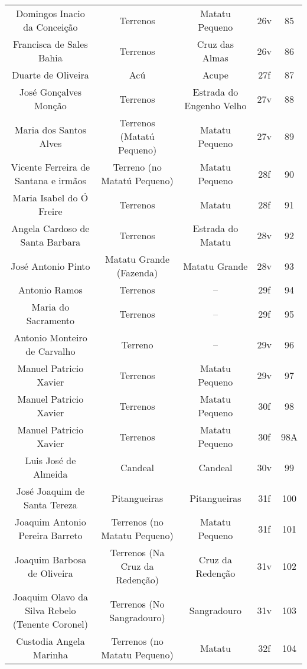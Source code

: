 \begin{table}[!htp]
{\begin{tiny}
\begin{tabular}{ccccc}
Domingos Inacio da Conceição							&Terrenos				&Matatu Pequeno				&26v			&85			&\\
Francisca de Sales Bahia							&Terrenos				&Cruz das Almas				&26v			&86			&\\
Duarte de Oliveira								&Acú					&Acupe					&27f			&87			&\\
José Gonçalves Monção								&Terrenos				&Estrada do Engenho Velho		&27v			&88			&\\
Maria dos Santos Alves								&Terrenos (Matatú Pequeno)		&Matatu Pequeno				&27v			&89			&\\
Vicente Ferreira de Santana e irmãos						&Terreno (no Matatú Pequeno)		&Matatu Pequeno				&28f			&90			&\\
Maria Isabel do Ó Freire							&Terrenos				&Matatu					&28f			&91			&\\
Angela Cardoso de Santa Barbara							&Terrenos				&Estrada do Matatu			&28v			&92			&\\
José Antonio Pinto								&Matatu Grande (Fazenda)		&Matatu Grande				&28v			&93			&\\
Antonio Ramos									&Terrenos				&--					&29f			&94			&\\
Maria do Sacramento								&Terrenos				&--					&29f			&95			&\\
Antonio Monteiro de Carvalho							&Terreno				&--					&29v			&96			&\\
Manuel Patricio Xavier								&Terrenos				&Matatu Pequeno				&29v			&97			&\\
Manuel Patricio Xavier								&Terrenos				&Matatu Pequeno				&30f			&98			&\\
Manuel Patricio Xavier								&Terrenos				&Matatu Pequeno				&30f			&98A			&\\
Luis José de Almeida								&Candeal				&Candeal				&30v			&99			&\\
José Joaquim de Santa Tereza							&Pitangueiras				&Pitangueiras				&31f			&100			&\\
Joaquim Antonio Pereira Barreto							&Terrenos (no Matatu Pequeno)		&Matatu Pequeno				&31f			&101			&\\
Joaquim Barbosa de Oliveira							&Terrenos (Na Cruz da Redenção)		&Cruz da Redenção			&31v			&102			&\\
Joaquim Olavo da Silva Rebelo (Tenente Coronel)					&Terrenos (No Sangradouro)		&Sangradouro				&31v			&103			&\\
Custodia Angela Marinha								&Terrenos (no Matatu Pequeno)		&Matatu					&32f			&104			&\\

\end{tabular}
\end{tiny}}
\end{table}
